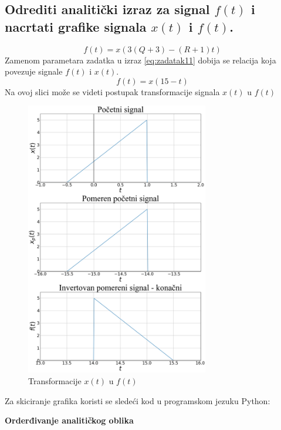 \documentclass[titlepage,a4paper,12pt]{article}
\begin{document}
	\subsection[Prvi deo]{Odrediti analitički izraz za signal $f(t)$ i nacrtati
		grafike signala $x(t)$ i $f(t)$.}
	\vspace{-15pt}
	\normalsize{}
	\begin{equation}
		f(t) = x(3(Q+3) - (R+1) t) \label{eq:zadatak11}
	\end{equation}
	\indent Zamenom parametara zadatka u izraz \eqref{eq:zadatak11} 	dobija se
	relacija koja povezuje signale $f(t)$ i $x(t)$.
	\begin{equation}
		f(t) = x(15 - t)
	\end{equation}
	\vspace{-0.1cm}
	\noindent Na ovoj slici može se videti postupak transformacije signala $x(t)$ u $f(t)$
	\begin{figure}[ht]
		\centering
		\includegraphics[width=8cm]{Images/zadatak1pic1.png}
		\caption{Transformacije $x(t)$ u $f(t)$}\label{fig:slika1}
	\end{figure}
	\FloatBarrier
	\clearpage
	\indent Za skiciranje grafika koristi se sledeći kod u programskom jezuku
	Python:
	
	\vspace{10pt}
	\textbf{Orderđivanje analitičkog oblika}\label{findanalityc1}\\\\
\end{document}
